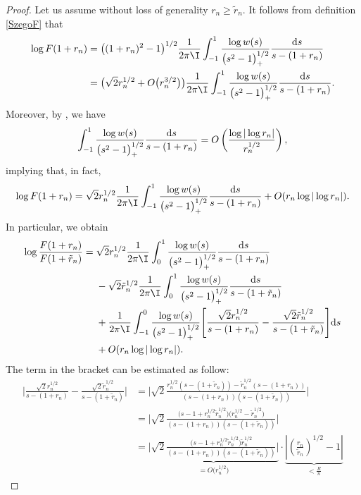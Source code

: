 \begin{proof}
Let us assume without loss of generality $r_n \geq \tilde r_n$. It follows from definition \eqref{SzegoF} that
\begin{align*}
 \log F(1+r_n) &= \big((1+r_n)^2-1\big)^{1/2} \frac{1}{2\pi \I}\int_{-1}^1 \frac{\log w(s)}{\big(s^2-1\big)_+^{1/2}} \frac{{\rm d}s}{s-(1+r_n)}
 \\
 &=\big(\sqrt{2} r_n^{1/2}+O\big(r_n^{3/2}\big)\big) \frac{1}{2\pi \I}\int_{-1}^1 \frac{\log w(s)}{\big(s^2-1\big)_+^{1/2}} \frac{{\rm d}s}{s-(1+r_n)}.
\end{align*}
Moreover, by \cite[equation~A.11]{CD}, we have
\begin{align*}
 \int_{-1}^1 \frac{\log w(s)}{\big(s^2-1\big)_+^{1/2}} \frac{{\rm d}s}{s-(1+r_n)} = O\left(\frac{\log |\log r_n|}{r_n^{1/2}}\right),
\end{align*}
implying that, in fact,
\begin{align*}
 \log F(1+r_n) = \sqrt{2} r_n^{1/2} \frac{1}{2\pi \I}\int_{-1}^1 \frac{\log w(s)}{\big(s^2-1\big)_+^{1/2}} \frac{{\rm d}s}{s-(1+r_n)}+O(r_n \log |\log r_n|).
\end{align*}
In particular, we obtain
\begin{align} \nonumber
 \log \frac{F(1+r_n)}{F(1+\tilde r_n)}={}&
 \sqrt{2} r_n^{1/2} \frac{1}{2\pi \I}\int_{0}^1 \frac{\log w(s)}{\big(s^2-1\big)_+^{1/2}} \frac{{\rm d}s}{s-(1+r_n)}\\
 &-\sqrt{2} \tilde r_n^{1/2} \frac{1}{2\pi \I}\int_{0}^1 \frac{\log w(s)}{\big(s^2-1\big)_+^{1/2}} \frac{{\rm d}s}{s-(1+\tilde r_n)} \nonumber
 \\
 &+\frac{1}{2\pi \I}\int_{-1}^0 \frac{\log w(s)}{\big(s^2-1\big)_+^{1/2}} \Bigg[\frac{\sqrt{2} r_n^{1/2}}{s-(1+r_n)}-\frac{\sqrt{2} \tilde r_n^{1/2}}{s-(1+\tilde r_n)}\Bigg] {\rm d}s \nonumber \\
 &+O(r_n \log |\log r_n|).\label{FF1}
\end{align}
The term in the bracket can be estimated as follow:
\begin{align*}
 \Bigg|\frac{\sqrt{2} r_n^{1/2}}{s-(1+r_n)}-\frac{\sqrt{2} \tilde r_n^{1/2}}{s-(1+\tilde r_n)}\Bigg| &= \Bigg|\sqrt{2} \frac{r_n^{1/2}(s-(1+\tilde r_n))-\tilde r_n^{1/2}(s-(1+ r_n))}{(s-(1+r_n))(s-(1+\tilde r_n))}\Bigg|
 \\
 &= \Bigg|\sqrt{2} \frac{\big(s-1+r_n^{1/2}\tilde r_n^{1/2}\big)\big(r_n^{1/2}-\tilde r_n^{1/2}\big)}{(s-(1+r_n))(s-(1+\tilde r_n))}\Bigg|
 \\
 &= \underbrace{\Bigg|\sqrt{2} \frac{\big(s-1+r_n^{1/2}\tilde r_n^{1/2}\big) \tilde r_n^{1/2}}{(s-(1+r_n))(s-(1+\tilde r_n))}\Bigg|}_{= O\big(r_n^{1/2}\big)} \cdot \underbrace{\left|\left(\frac{r_n}{\tilde r_n}\right)^{1/2} -1 \right|}_{< \frac{R}{n}}

\end{align*}
\end{proof}
